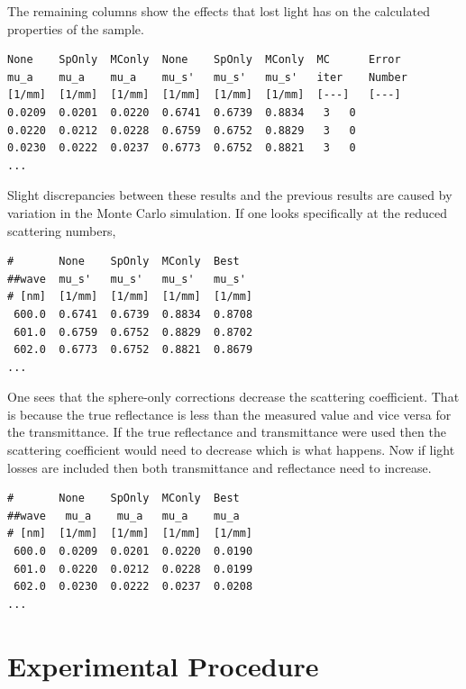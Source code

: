 \documentclass{article}
\begin{document}
The remaining columns show the effects that lost light has on the calculated
properties of the sample.
\begin{verbatim}
None    SpOnly  MConly  None    SpOnly  MConly  MC      Error
mu_a    mu_a    mu_a    mu_s'   mu_s'   mu_s'   iter    Number
[1/mm]  [1/mm]  [1/mm]  [1/mm]  [1/mm]  [1/mm]  [---]   [---]
0.0209  0.0201  0.0220  0.6741  0.6739  0.8834   3   0
0.0220  0.0212  0.0228  0.6759  0.6752  0.8829   3   0
0.0230  0.0222  0.0237  0.6773  0.6752  0.8821   3   0
...
\end{verbatim}

\noindent Slight discrepancies between these results and the previous results are caused by 
variation in the Monte Carlo simulation.  If one looks specifically at the reduced scattering
numbers,
\begin{verbatim}
#       None    SpOnly  MConly  Best    
##wave  mu_s'   mu_s'   mu_s'   mu_s'
# [nm]  [1/mm]  [1/mm]  [1/mm]  [1/mm]
 600.0  0.6741  0.6739  0.8834  0.8708
 601.0  0.6759  0.6752  0.8829  0.8702
 602.0  0.6773  0.6752  0.8821  0.8679
...
\end{verbatim}
One sees that the sphere-only corrections decrease the scattering coefficient.  That is 
because the true reflectance is less than the measured value and vice versa for the 
transmittance.  If the true reflectance and transmittance were used then the scattering
coefficient would need to decrease which is what happens.  Now if light losses are included
then both transmittance and reflectance need to increase.  

\begin{verbatim}
#       None    SpOnly  MConly  Best
##wave   mu_a    mu_a   mu_a    mu_a
# [nm]  [1/mm]  [1/mm]  [1/mm]  [1/mm]
 600.0  0.0209  0.0201  0.0220  0.0190
 601.0  0.0220  0.0212  0.0228  0.0199
 602.0  0.0230  0.0222  0.0237  0.0208
...
\end{verbatim}

\clearpage
\section{Experimental Procedure}
\end{document}
